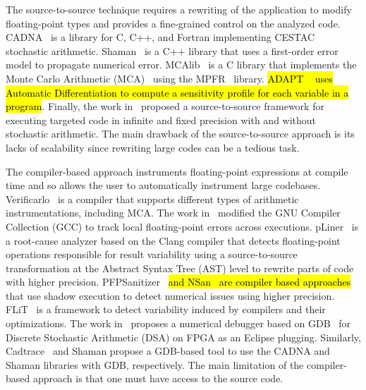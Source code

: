 \documentclass[10pt,journal,compsoc]{IEEEtran}
\DeclareRobustCommand{\add}[1]{\sethlcolor{lightgreen}\hl{#1}}
\begin{document}
The source-to-source technique requires a rewriting of the application to modify
floating-point types and provides a fine-grained control on the analyzed code.
CADNA~\cite{jezequel2008cadna} is a library for C, C++, and Fortran implementing
CESTAC~\cite{vignes1993stochastic} stochastic arithmetic.
Shaman~\cite{demeure_phd} is a C++ library that uses a first-order error model
to propagate numerical error. MCAlib~\cite{frechtling2015mcalib} is a C library
that implements the Monte Carlo Arithmetic (MCA)~\cite{parker1997monte} using
the MPFR~\cite{fousse2007mpfr} library. \add{ADAPT \mbox{~\cite{menon2018adapt}} uses
    Automatic Differentiation to compute a sensitivity profile for each variable in a
    program}. Finally, the work in~\cite{tang2016software} proposed a
source-to-source framework for executing targeted code in infinite and fixed
precision with and without stochastic arithmetic. The main drawback of the
source-to-source approach is its lacks of scalability since rewriting large
codes can be a tedious task.


The compiler-based approach instruments floating-point expressions at compile
time and so allows the user to automatically instrument large codebases.
Verificarlo~\cite{verificarlo} is a compiler that supports different types of
arithmetic instrumentations, including MCA. The work in~\cite{bao2013fly}
modified the GNU Compiler Collection (GCC) to track local floating-point errors
across executions. pLiner~\cite{guo2020pliner} is a root-cause analyzer based on
the Clang compiler that detects floating-point operations responsible for result
variability using a source-to-source transformation at the Abstract Syntax Tree
(AST) level to rewrite parts of code with higher precision.
PFPSanitizer~\cite{chowdhary2020debugging,chowdhary2021parallel} \add{and
    NSan~\mbox{\cite{courbet2021nsan}} are compiler based approaches}
that use shadow execution to detect numerical issues using higher
precision.
FLiT~\cite{sawaya2017flit} is a framework to detect variability
induced by compilers and their optimizations. The work
in~\cite{wang2012development} proposes a numerical debugger based on
GDB~\cite{stallman1988debugging} for Discrete Stochastic Arithmetic (DSA) on
FPGA as an Eclipse plugging. Similarly, Cadtrace~\cite{jezequel2008cadna} and
Shaman propose a GDB-based tool to use the CADNA and Shaman libraries with GDB,
respectively. The main limitation of the compiler-based approach is that one
must have access to the source code.
\end{document}
